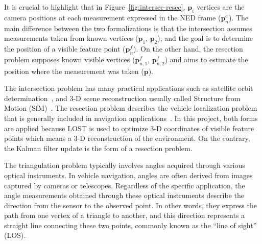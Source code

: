 It is crucial to highlight that in Figure~\ref{fig:intersec-resec}, $\mathbf{p}_i$ vertices are the camera positions at each measurement expressed in the NED frame ($\mathbf{p}_n^c$). The main difference between the two formalizations is that the intersection assumes measurements taken from known vertices ($\mathbf{p}_1$, $\mathbf{p}_2$), and the goal is to determine the position of a visible feature point ($\mathbf{p}_n^f$). On the other hand, the resection problem supposes known visible vertices ($\mathbf{p}_{n, 1}^f$, $\mathbf{p}_{n, 2}^f$) and aims to estimate the position where the measurement was taken ($\mathbf{p}$).

The intersection problem has many practical applications such as satellite orbit determination~\cite{TriagulationSpaceOrb1, TriagulationSpaceOrb2}, and 3-D scene reconstruction usually called Structure from Motion (SfM)~\cite{Triang3D1, Triang3D2, Triang3D3}. The resection problem describes the vehicle localization problem that is generally included in navigation applications~\cite{rel-nav-1, rel-nav-2, TriangNav}. In this project, both forms are applied because LOST is used to optimize 3-D coordinates of visible feature points which means a 3-D reconstruction of the environment. On the contrary, the Kalman filter update is the form of a resection problem.

The triangulation problem typically involves angles acquired through various optical instruments. In vehicle navigation, angles are often derived from images captured by cameras or telescopes. Regardless of the specific application, the angle measurements obtained through these optical instruments describe the direction from the sensor to the observed point. In other words, they express the path from one vertex of a triangle to another, and this direction represents a straight line connecting these two points, commonly known as the ``line of sight'' (LOS).

